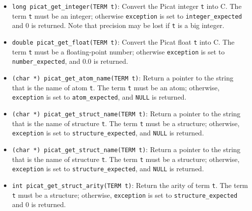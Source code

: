 \begin{itemize}
\item \texttt{long picat\_get\_integer(TERM t)}: Convert the Picat integer \texttt{t} into C. The term \texttt{t} must be an integer; otherwise \texttt{exception} is set to \texttt{integer\_expected} and 0 is returned. Note that precision may be lost if \texttt{t} is a big integer.

\item \texttt{double picat\_get\_float(TERM t)}: Convert the Picat float \texttt{t} into C. The term \texttt{t} must be a floating-point number; otherwise \texttt{exception} is set to \texttt{number\_expected}, and 0.0 is returned. 

\item \texttt{(char *) picat\_get\_atom\_name(TERM t)}: Return a pointer to the string that is the name of atom \texttt{t}. The term \texttt{t} must be an atom; otherwise, \texttt{exception} is set to \texttt{atom\_expected}, and \texttt{NULL} is returned. 

\item \texttt{(char *) picat\_get\_struct\_name(TERM t)}: Return a pointer to the string that is the name of structure \texttt{t}. The term \texttt{t} must be a structure; otherwise, \texttt{exception} is set to \texttt{structure\_expected}, and \texttt{NULL} is returned. 

\item \texttt{(char *) picat\_get\_struct\_name(TERM t)}: Return a pointer to the string that is the name of structure \texttt{t}. The term \texttt{t} must be a structure; otherwise, \texttt{exception} is set to \texttt{structure\_expected}, and \texttt{NULL} is returned. 

\item \texttt{int picat\_get\_struct\_arity(TERM t)}: Return the arity of term \texttt{t}.  The term \texttt{t} must be a structure; otherwise, \texttt{exception} is set to \texttt{structure\_expected} and 0 is returned.
\end{itemize}

